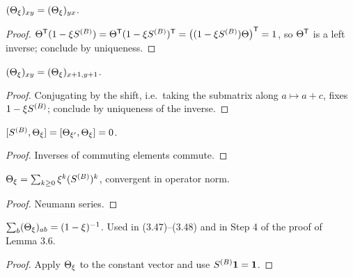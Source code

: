 \begin{lemma}\label{lem:Theta-sym}
  \leanok{}
  $(\Theta_\xi)_{xy}=(\Theta_\xi)_{yx}$.
\end{lemma}
\begin{proof}\leanok{}
  $\Theta^{\mathsf T}(1-\xi S^{(B)}) = \Theta^{\mathsf T}(1-\xi S^{(B)})^{\mathsf T}
   = \bigl((1-\xi S^{(B)})\Theta\bigr)^{\mathsf T} = 1$, so $\Theta^{\mathsf T}$ is a left
  inverse; conclude by uniqueness.
\end{proof}

\begin{lemma}\label{lem:Theta-transl}
  \leanok{}
  $(\Theta_\xi)_{xy}=(\Theta_\xi)_{x+1,y+1}$.
\end{lemma}
\begin{proof}\leanok{}
  Conjugating by the shift, i.e.\ taking the submatrix along $a\mapsto a+c$,
  fixes $1-\xi S^{(B)}$; conclude by uniqueness of the inverse.
\end{proof}

\begin{lemma}\label{lem:Theta-comm}
  \leanok{}
  $[S^{(B)},\Theta_\xi]=[\Theta_{\xi'},\Theta_\xi]=0$.
\end{lemma}
\begin{proof}\leanok{}
  Inverses of commuting elements commute.
\end{proof}

\begin{lemma}\label{lem:Theta-series}
  \leanok{}
  $\Theta_\xi=\sum_{k\ge 0}\xi^k(S^{(B)})^k$, convergent in operator norm.
\end{lemma}
\begin{proof}\leanok{}
  Neumann series.
\end{proof}

\begin{lemma}\label{lem:Theta-rowsum}
  \leanok
  $\sum_b (\Theta_\xi)_{ab} = (1-\xi)^{-1}$.  Used in (3.47)--(3.48) and in Step 4 of
  the proof of Lemma 3.6.
\end{lemma}
\begin{proof}\leanok{}
  Apply $\Theta_\xi$ to the constant vector and use $S^{(B)}\mathbf 1=\mathbf 1$.
\end{proof}

